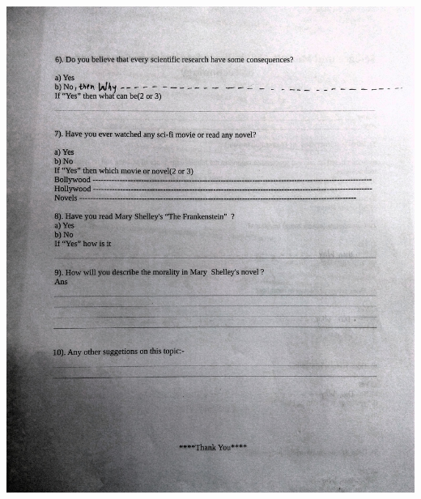 \documentclass[12pt]{report}
\begin{document}
\includegraphics[width=6in,height=9in]{a2.jpg}
\end{document}
